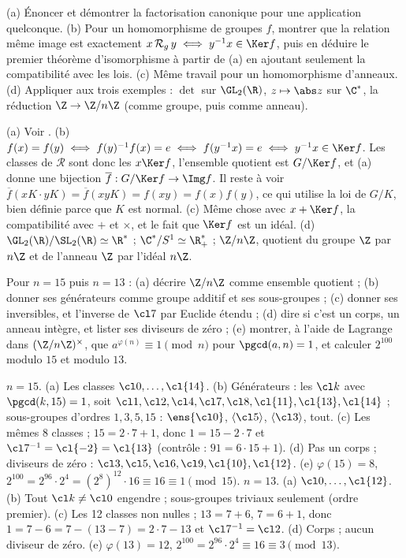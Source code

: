 \begin{exo}
(a) Énoncer et démontrer la factorisation canonique pour une application quelconque. (b) Pour un homomorphisme de groupes $f$, montrer que la relation \og même image \fg{} est exactement $x\,\mathcal R_g\,y\iff y^{-1}x\in\Ker f$, puis en déduire le premier théorème d'isomorphisme à partir de (a) en ajoutant seulement la compatibilité avec les lois. (c) Même travail pour un homomorphisme d'anneaux. (d) Appliquer aux trois exemples : $\det$ sur $\GL_2(\R)$, $z\mapsto\abs z$ sur $\C^*$, la réduction $\Z\to\Z/n\Z$ (comme groupe, puis comme anneau).
\begin{corrige}
(a) Voir . (b) $f(x)=f(y)\iff f(y)^{-1}f(x)=e\iff f(y^{-1}x)=e\iff y^{-1}x\in\Ker f$. Les classes de $\mathcal R$ sont donc les $x\Ker f$, l'ensemble quotient est $G/\Ker f$, et (a) donne une bijection $\overline f:G/\Ker f\to\Img f$. Il reste à voir $\overline f(xK\cdot yK)=\overline f(xyK)=f(xy)=f(x)f(y)$, ce qui utilise la loi de $G/K$, bien définie parce que $K$ est normal. (c) Même chose avec $x+\Ker f$, la compatibilité avec $+$ et $\times$, et le fait que $\Ker f$ est un idéal. (d) $\GL_2(\R)/\SL_2(\R)\simeq\R^*$ ; $\C^*/S^1\simeq\R_+^*$ ; $\Z/n\Z$, quotient du groupe $\Z$ par $n\Z$ et de l'anneau $\Z$ par l'idéal $n\Z$.
\end{corrige}
\end{exo}
\begin{exo}
Pour $n=15$ puis $n=13$ : (a) décrire $\Z/n\Z$ comme ensemble quotient ; (b) donner ses générateurs comme groupe additif et ses sous-groupes ; (c) donner ses inversibles, et l'inverse de $\cl7$ par Euclide étendu ; (d) dire si c'est un corps, un anneau intègre, et lister ses diviseurs de zéro ; (e) montrer, à l'aide de Lagrange dans $(\Z/n\Z)^\times$, que $a^{\varphi(n)}\equiv1\pmod n$ pour $\pgcd(a,n)=1$, et calculer $2^{100}$ modulo $15$ et modulo $13$.
\begin{corrige}
$n=15$. (a) Les classes $\cl0,\dots,\cl{14}$. (b) Générateurs : les $\cl k$ avec $\pgcd(k,15)=1$, soit $\cl1,\cl2,\cl4,\cl7,\cl8,\cl{11},\cl{13},\cl{14}$ ; sous-groupes d'ordres $1,3,5,15$ : $\ens{\cl0}$, $\langle\cl5\rangle$, $\langle\cl3\rangle$, tout. (c) Les mêmes 8 classes ; $15=2\cdot7+1$, donc $1=15-2\cdot7$ et $\cl7^{-1}=\cl{-2}=\cl{13}$ (contrôle : $91=6\cdot15+1$). (d) Pas un corps ; diviseurs de zéro : $\cl3,\cl5,\cl6,\cl9,\cl{10},\cl{12}$. (e) $\varphi(15)=8$, $2^{100}=2^{96}\cdot2^4=(2^8)^{12}\cdot16\equiv16\equiv1\pmod{15}$.
$n=13$. (a) $\cl0,\dots,\cl{12}$. (b) Tout $\cl k\neq\cl0$ engendre ; sous-groupes triviaux seulement (ordre premier). (c) Les 12 classes non nulles ; $13=7+6$, $7=6+1$, donc $1=7-6=7-(13-7)=2\cdot7-13$ et $\cl7^{-1}=\cl2$. (d) Corps ; aucun diviseur de zéro. (e) $\varphi(13)=12$, $2^{100}=2^{96}\cdot2^4\equiv16\equiv3\pmod{13}$.
\end{corrige}
\end{exo}
